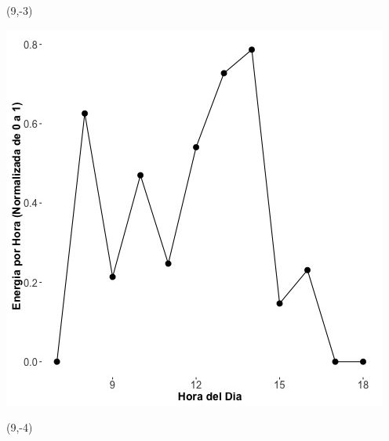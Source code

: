 \documentclass{article}\usepackage[]{graphicx}\usepackage[]{color}
\newenvironment{knitrout}{}{} %
\begin{document}
 \begin{textblock}{1}(9,-3)
\begin{minipage}{20em}
\begingroup

\endgroup
\end{minipage}
\end{textblock}

 \vspace{2cm}

\begin{knitrout}
\color{fgcolor}
\includegraphics[scale=0.75]{figure/A6_fplot_norm_median} 
\end{knitrout}


 \begin{textblock}{1}(9,-4)
\begin{minipage}{20em}
\begingroup

\endgroup
\end{minipage}
\end{textblock}

 \vspace{2cm}
\end{document}
